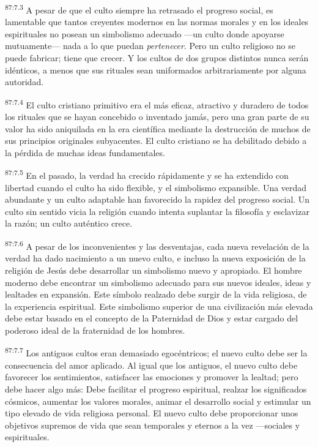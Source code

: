 \par
\textsuperscript{87:7.3} A pesar de que el culto siempre ha retrasado el progreso social, es lamentable que tantos creyentes modernos en las normas morales y en los ideales espirituales no posean un simbolismo adecuado ---un culto donde apoyarse mutuamente--- nada a lo que puedan \textit{pertenecer}. Pero un culto religioso no se puede fabricar; tiene que crecer. Y los cultos de dos grupos distintos nunca serán idénticos, a menos que sus rituales sean uniformados arbitrariamente por alguna autoridad.

\par
\textsuperscript{87:7.4} El culto cristiano primitivo era el más eficaz, atractivo y duradero de todos los rituales que se hayan concebido o inventado jamás, pero una gran parte de su valor ha sido aniquilada en la era científica mediante la destrucción de muchos de sus principios originales subyacentes. El culto cristiano se ha debilitado debido a la pérdida de muchas ideas fundamentales.

\par
\textsuperscript{87:7.5} En el pasado, la verdad ha crecido rápidamente y se ha extendido con libertad cuando el culto ha sido flexible, y el simbolismo expansible. Una verdad abundante y un culto adaptable han favorecido la rapidez del progreso social. Un culto sin sentido vicia la religión cuando intenta suplantar la filosofía y esclavizar la razón; un culto auténtico crece.

\par
\textsuperscript{87:7.6} A pesar de los inconvenientes y las desventajas, cada nueva revelación de la verdad ha dado nacimiento a un nuevo culto, e incluso la nueva exposición de la religión de Jesús debe desarrollar un simbolismo nuevo y apropiado. El hombre moderno debe encontrar un simbolismo adecuado para sus nuevos ideales, ideas y lealtades en expansión. Este símbolo realzado debe surgir de la vida religiosa, de la experiencia espiritual. Este simbolismo superior de una civilización más elevada debe estar basado en el concepto de la Paternidad de Dios y estar cargado del poderoso ideal de la fraternidad de los hombres.

\par
\textsuperscript{87:7.7} Los antiguos cultos eran demasiado egocéntricos; el nuevo culto debe ser la consecuencia del amor aplicado. Al igual que los antiguos, el nuevo culto debe favorecer los sentimientos, satisfacer las emociones y promover la lealtad; pero debe hacer algo más: Debe facilitar el progreso espiritual, realzar los significados cósmicos, aumentar los valores morales, animar el desarrollo social y estimular un tipo elevado de vida religiosa personal. El nuevo culto debe proporcionar unos objetivos supremos de vida que sean temporales y eternos a la vez ---sociales y espirituales.

